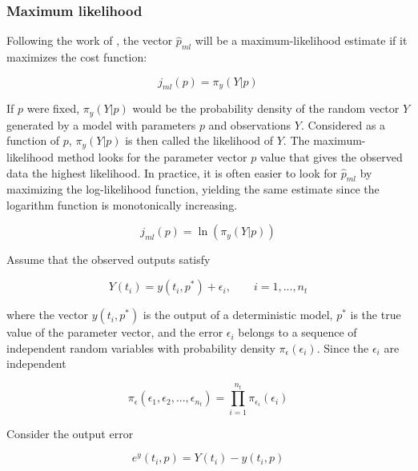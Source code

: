 \documentclass[../Article_Design_of_Experiment.tex]{subfiles}
\begin{document}
			
	\subsubsection{Maximum likelihood}

	Following the work of \citet{Walter2010}, the vector $\hat{p}_{ml}$ will be a maximum-likelihood estimate if it maximizes the cost function:
	
	{\footnotesize
	\begin{equation}
		j_{ml}(p) = \pi_y (Y|p) 
	\end{equation} }
	
	If $p$ were fixed, $\pi_y(Y|p)$ would be the probability density of the random vector $Y$ generated by a model with parameters $p$ and observations $Y$. Considered as a function of $p$, $\pi_y(Y|p)$ is then called the likelihood of $Y$. The maximum-likelihood method looks for the parameter vector $p$ value that gives the observed data the highest likelihood. In practice, it is often easier to look for $\hat{p}_{ml}$ by maximizing the log-likelihood function, yielding the same estimate since the logarithm function is monotonically increasing.
	
	{\footnotesize
	\begin{equation}
		j_{ml}(p) = \ln ( \pi_y (Y|p) )
	\end{equation} }
	
	Assume that the observed outputs satisfy 
	
	{\footnotesize
	\begin{equation}
		Y(t_i) = y(t_i, p^*) + \epsilon_i, \qquad i=1,...,n_t
	\end{equation} }
	
	where the vector $y(t_i, p^*)$ is the output of a deterministic model, $p^*$ is the true value of the parameter vector, and the error $\epsilon_i$ belongs to a sequence of independent random variables with probability density $\pi_{\epsilon}(\epsilon_i)$. Since the $\epsilon_i$ are independent
	
	{\footnotesize
	\begin{equation}
		\pi_{\epsilon}(\epsilon_1, \epsilon_2, ..., \epsilon_{n_t}) = \prod_{i=1}^{n_t} \pi_{\epsilon_i}(\epsilon_i)
	\end{equation} }
	
	Consider the output error
	
	{\footnotesize
	\begin{equation} \label{EQ:Error_measurment}
		e^y(t_i, p) = Y(t_i) - y(t_i, p)
	\end{equation} }
	
\end{document}

